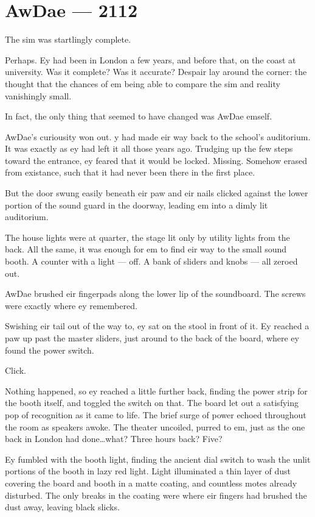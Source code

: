 \chapter*{AwDae — 2112}

The sim was startlingly complete.

Perhaps. Ey had been in London a few years, and before that, on the coast at university. Was it complete? Was it accurate? Despair lay around the corner: the thought that the chances of em being able to compare the sim and reality vanishingly small.

In fact, the only thing that seemed to have changed was AwDae emself.

AwDae's curiousity won out. y had made eir way back to the school's auditorium. It was exactly as ey had left it all those years ago. Trudging up the few steps toward the entrance, ey feared that it would be locked. Missing. Somehow erased from existance, such that it had never been there in the first place.

But the door swung easily beneath eir paw and eir nails clicked against the lower portion of the sound guard in the doorway, leading em into a dimly lit auditorium.

The house lights were at quarter, the stage lit only by utility lights from the back. All the same, it was enough for em to find eir way to the small sound booth. A counter with a light --- off. A bank of sliders and knobs --- all zeroed out.

AwDae brushed eir fingerpads along the lower lip of the soundboard. The screws were exactly where ey remembered.

Swishing eir tail out of the way to, ey sat on the stool in front of it. Ey reached a paw up past the master sliders, just around to the back of the board, where ey found the power switch.

Click.

Nothing happened, so ey reached a little further back, finding the power strip for the booth itself, and toggled the switch on that. The board let out a satisfying pop of recognition as it came to life. The brief surge of power echoed throughout the room as speakers awoke. The theater uncoiled, purred to em, just as the one back in London had done\ldots{}what? Three hours back? Five?

Ey fumbled with the booth light, finding the ancient dial switch to wash the unlit portions of the booth in lazy red light. Light illuminated a thin layer of dust covering the board and booth in a matte coating, and countless motes already disturbed. The only breaks in the coating were where eir fingers had brushed the dust away, leaving black slicks.

